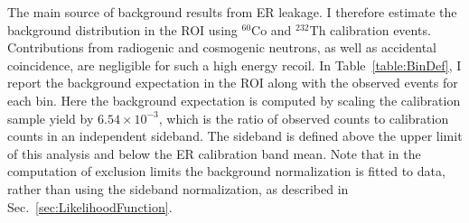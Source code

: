 The main source of background results from ER leakage. I therefore estimate the background distribution in the ROI using $^{60}$Co and $^{232}$Th calibration events.  
Contributions from radiogenic and cosmogenic neutrons, as well as accidental coincidence, are negligible for such a high energy recoil. In Table~\ref{table:BinDef}, I report the 
background expectation in the ROI along with the observed events for each bin.
Here the background expectation is computed by scaling the calibration sample yield by $6.54\times10^{-3}$, which is the ratio of observed counts to calibration counts in an independent sideband. The sideband is defined above the upper limit of this analysis and below the ER calibration band mean. Note that in the computation of exclusion limits the background normalization is fitted to data, rather than using the sideband normalization, as described in Sec.~\ref{sec:LikelihoodFunction}. 



\begin{table}

  \label{table:BinDef} 
\end{table}






